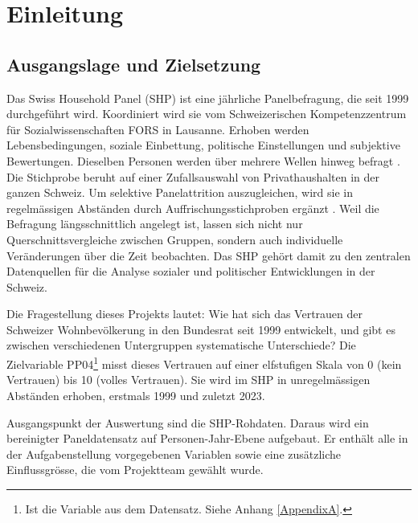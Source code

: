 

\chapter{Einleitung}
\label{Chapter1}


\section{Ausgangslage und Zielsetzung}
\label{sec:ausgangslage}

Das Swiss Household Panel (SHP) ist eine jährliche Panelbefragung, die seit 1999
durchgeführt wird. Koordiniert wird sie vom Schweizerischen Kompetenzzentrum für
Sozialwissenschaften FORS in Lausanne. Erhoben werden Lebensbedingungen, soziale
Einbettung, politische Einstellungen und subjektive Bewertungen. Dieselben Personen
werden über mehrere Wellen hinweg befragt \cite{FORS2024}. Die Stichprobe beruht auf
einer Zufallsauswahl von Privathaushalten in der ganzen Schweiz. Um selektive
Panelattrition auszugleichen, wird sie in regelmässigen Abständen durch
Auffrischungsstichproben ergänzt \cite{Voorpostel2018}. Weil die Befragung
längsschnittlich angelegt ist, lassen sich nicht nur Querschnittsvergleiche zwischen
Gruppen, sondern auch individuelle Veränderungen über die Zeit beobachten. Das SHP
gehört damit zu den zentralen Datenquellen für die Analyse sozialer und politischer
Entwicklungen in der Schweiz.

Die Fragestellung dieses Projekts lautet: Wie hat sich das Vertrauen der Schweizer Wohnbevölkerung in den Bundesrat seit 1999 entwickelt, und gibt es
zwischen verschiedenen Untergruppen systematische Unterschiede? Die Zielvariable
PP04\footnote{Ist die Variable aus dem Datensatz. Siehe Anhang \ref{AppendixA}.} misst dieses Vertrauen auf einer elfstufigen Skala von 0 (kein Vertrauen)
bis 10 (volles Vertrauen). Sie wird im SHP in unregelmässigen Abständen erhoben,
erstmals 1999 und zuletzt 2023.

Ausgangspunkt der Auswertung sind die SHP-Rohdaten. Daraus wird ein bereinigter
Paneldatensatz auf Personen-Jahr-Ebene aufgebaut. Er enthält alle in der Aufgabenstellung
vorgegebenen Variablen sowie eine zusätzliche Einflussgrösse, die vom Projektteam
gewählt wurde.

